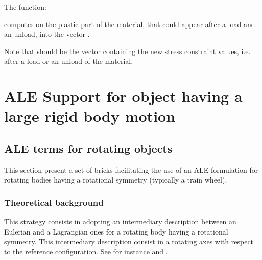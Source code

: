 \documentclass[a4paper,11pt,english]{sphinxmanual}
\begin{document}
The function:

\begin{sphinxVerbatim}[commandchars=\\\{\}]
              
\end{sphinxVerbatim}

computes on  the plastic part of the material, that could appear after a load and an unload, into the vector .

Note that  should be the vector containing the new stress constraint values, i.e. after a load or an unload of the material.

\ignorespaces 

\chapter{ALE Support for object having a large rigid body motion}
\label{\detokenize{userdoc/model_ALE_rotating:ale-support-for-object-having-a-large-rigid-body-motion}}\label{\detokenize{userdoc/model_ALE_rotating:ud-model-ale-rotating}}\label{\detokenize{userdoc/model_ALE_rotating:index-0}}\label{\detokenize{userdoc/model_ALE_rotating::doc}}

\section{ALE terms for rotating objects}
\label{\detokenize{userdoc/model_ALE_rotating:ale-terms-for-rotating-objects}}
This section present a set of bricks facilitating the use of an ALE formulation for rotating bodies having a rotational symmetry (typically a train wheel).


\subsection{Theoretical background}
\label{\detokenize{userdoc/model_ALE_rotating:theoretical-background}}
This strategy consists in adopting an intermediary description between an Eulerian and a Lagrangian ones for a rotating body having a rotational symmetry. This intermediary description consist in a rotating axes with respect to the reference configuration. See for instance  and .
\end{document}
